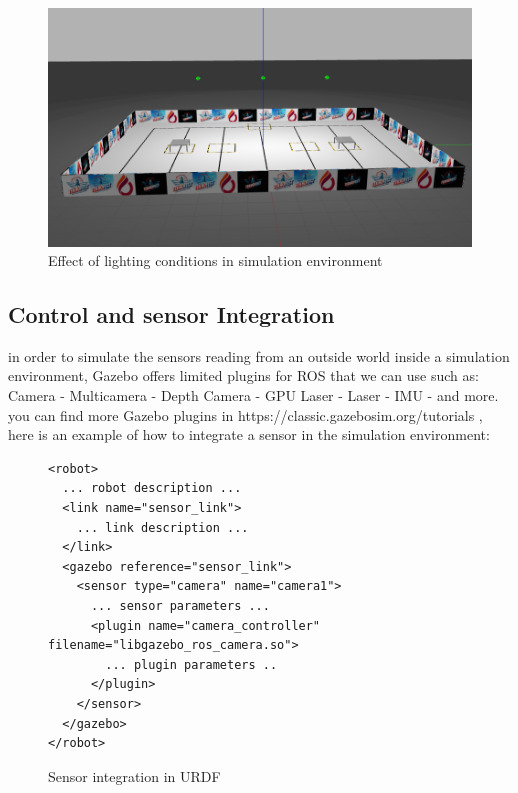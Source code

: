 \documentclass[../../main]{subfiles}
\begin{document}
\begin{itemize}
  \begin{figure}[H]
    \centering
\includegraphics[width=\textwidth]{fig/competition_area_light.png}
\caption{Effect of lighting conditions in simulation environment}
\label{Competition area with good lighting} %
\end{figure}
   \end{itemize}

\subsection{Control and sensor Integration} 

in order to simulate the sensors reading from an outside world inside a simulation environment, Gazebo offers limited plugins for ROS that we can use such as:
Camera - Multicamera - Depth Camera - GPU Laser - Laser - IMU - and more.
you can find more Gazebo plugins in https://classic.gazebosim.org/tutorials ,
here is an example of how to integrate a  sensor in the simulation environment:
\begin{figure}[h!]
  \begin{verbatim}
<robot>
  ... robot description ...
  <link name="sensor_link">
    ... link description ...
  </link>
  <gazebo reference="sensor_link">
    <sensor type="camera" name="camera1">
      ... sensor parameters ...
      <plugin name="camera_controller" filename="libgazebo_ros_camera.so">
        ... plugin parameters ..
      </plugin>
    </sensor>
  </gazebo>
</robot>
\end{verbatim}
\caption{Sensor integration in URDF} 
  \end{figure}
\end{document}
